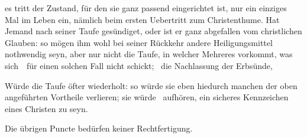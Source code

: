 \begin{aufza}
\begin{aufzb}
\item es tritt der Zustand, für den sie ganz passend eingerichtet ist, nur ein einziges Mal im Leben ein, nämlich beim ersten Uebertritt zum Christenthume. Hat Jemand nach seiner Taufe gesündiget, oder ist er ganz abgefallen vom christlichen Glauben: so mögen ihm wohl bei seiner Rückkehr andere Heiligungsmittel nothwendig seyn, aber nur nicht die Taufe, in welcher Mehreres vorkommt, was sich~\ für einen solchen Fall nicht schickt; \zB\  die Nachlassung der Erbsünde, \udgl\ 
\item Würde die Taufe öfter wiederholt: so würde sie eben hiedurch manchen der oben angeführten Vortheile verlieren; sie würde \zB\  aufhören, ein sicheres Kennzeichen eines Christen zu seyn.\par
Die übrigen Puncte bedürfen keiner Rechtfertigung.
\end{aufzb}
\end{aufza}

